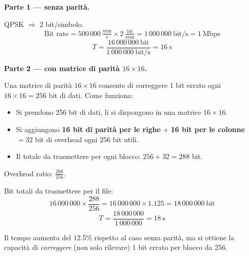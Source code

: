 \documentclass{report}
\begin{document}
\begin{solution}
\textbf{Parte 1 --- senza parità.}

QPSK $\Rightarrow$ 2 bit/simbolo.
\[
  \text{Bit rate} = 500\,000\ \tfrac{\text{sym}}{\text{s}} \times 2\ \tfrac{\text{bit}}{\text{sym}}
                 = 1\,000\,000\ \text{bit/s} = 1\ \text{Mbps}
\]
\[
  T = \frac{16\,000\,000\ \text{bit}}{1\,000\,000\ \text{bit/s}} = \boxed{16\ \text{s}}
\]

\medskip
\textbf{Parte 2 --- con matrice di parità $16\times16$.}

Una matrice di parità $16\times16$ consente di correggere 1 bit errato ogni $16\times16=256$
bit di dati. Come funziona:
\begin{itemize}
  \item Si prendono 256 bit di dati, li si dispongono in una matrice $16\times16$.
  \item Si aggiungono \textbf{16 bit di parità per le righe} + \textbf{16 bit per le colonne}
        $= 32$ bit di overhead ogni 256 bit utili.
  \item Il totale da trasmettere per ogni blocco: $256 + 32 = 288$ bit.
\end{itemize}

Overhead ratio: $\tfrac{288}{256}$.

Bit totali da trasmettere per il file:
\[
  16\,000\,000 \times \frac{288}{256} = 16\,000\,000 \times 1.125 = 18\,000\,000\ \text{bit}
\]
\[
  T = \frac{18\,000\,000}{1\,000\,000} = \boxed{18\ \text{s}}
\]

Il tempo aumenta del 12.5\% rispetto al caso senza parità, ma si ottiene la
capacità di \emph{correggere} (non solo rilevare) 1 bit errato per blocco da 256.
\end{solution}
\end{document}
